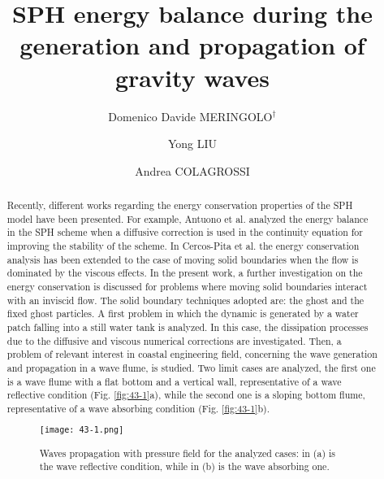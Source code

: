 \documentclass[10pt]{article}
\title{SPH energy balance during the generation and propagation of gravity waves}
\date{}
\author[1]{Domenico Davide MERINGOLO$^\dagger$}
\author[1]{Yong LIU}
\author[2]{Andrea COLAGROSSI}
\affil[1]{Ocean University of China, Qingdao, 266100}
\affil[2]{CNR-INSEAN, Rome, 00128, Italy}
\affil[$\relax$]{\email{\dagger}{davide.m86@gmail.com}}
\begin{document}
\maketitle


\begin{abstract}
Recently, different works regarding the energy conservation properties of the SPH model have been presented. For example, Antuono et al. \cite{antuono2015energy} analyzed the energy balance in the SPH scheme when a diffusive correction is used in the continuity equation for improving the stability of the scheme. In Cercos-Pita et al. \cite{cercos2017sph} the energy conservation analysis has been extended to the case of moving solid boundaries when the flow is dominated by the viscous effects. In the present work, a further investigation on the energy conservation is discussed for problems where moving solid boundaries interact with an inviscid flow. The solid boundary techniques adopted are: the ghost and the fixed ghost particles. A first problem in which the dynamic is generated by a water patch falling into a still water tank is analyzed. In this case, the dissipation processes due to the diffusive and viscous numerical corrections are investigated. Then, a problem of relevant interest in coastal engineering field, concerning the wave generation and propagation in a wave flume, is studied. Two limit cases are analyzed, the first one is a wave flume with a flat bottom and a vertical wall, representative of a wave reflective condition (Fig. \ref{fig:43-1}a), while the second one is a sloping bottom flume, representative of a wave absorbing condition (Fig. \ref{fig:43-1}b).
\begin{figure}[!htb]
\centering
\texttt{[image: 43-1.png]}
\caption{Waves propagation with pressure field for the analyzed cases: in (a) is the wave reflective condition,
while in (b) is the wave absorbing one.}\label{fig:43-1} 
\end{figure}


\end{abstract}
\end{document}
